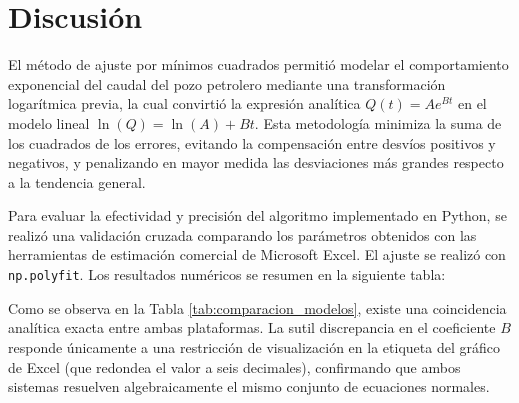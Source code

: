 
\chapter{Discusión}

El método de ajuste por mínimos cuadrados permitió modelar el comportamiento exponencial del caudal del pozo petrolero mediante una transformación logarítmica previa, la cual convirtió la expresión analítica $Q(t)=Ae^{Bt}$ en el modelo lineal $\ln(Q)=\ln(A)+Bt$. Esta metodología minimiza la suma de los cuadrados de los errores, evitando la compensación entre desvíos positivos y negativos, y penalizando en mayor medida las desviaciones más grandes respecto a la tendencia general.

Para evaluar la efectividad y precisión del algoritmo implementado en Python, se realizó una validación cruzada comparando los parámetros obtenidos con las herramientas de estimación comercial de Microsoft Excel. El ajuste se realizó con \texttt{np.polyfit}. Los resultados numéricos se resumen en la siguiente tabla:

\begin{table}[h!]
\centering
\caption{Comparación de parámetros de ajuste: Python vs. Excel}
\label{tab:comparacion_modelos}
\end{table}

Como se observa en la Tabla \ref{tab:comparacion_modelos}, existe una coincidencia analítica exacta entre ambas plataformas. La sutil discrepancia en el coeficiente $B$ responde únicamente a una restricción de visualización en la etiqueta del gráfico de Excel (que redondea el valor a seis decimales), confirmando que ambos sistemas resuelven algebraicamente el mismo conjunto de ecuaciones normales.

